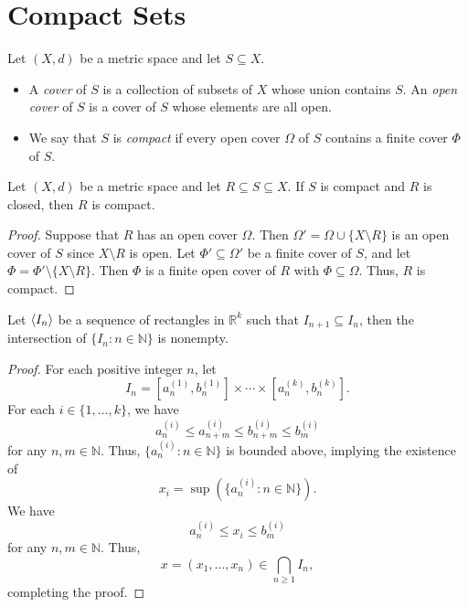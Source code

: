 \section{Compact Sets}
\begin{definition}
  Let $(X, d)$ be a metric space and let $S \subseteq X$.
  \begin{itemize}
    \item A \emph{cover} of $S$ is a collection of subsets of $X$ whose union
    contains $S$.
    An \emph{open cover} of $S$ is a cover of $S$ whose elements are all open.
    \item We say that $S$ is \emph{compact} if every open cover $\Omega$ of $S$
    contains a finite cover $\Phi$ of $S$.
  \end{itemize}
\end{definition}

\begin{theorem}
  Let $(X, d)$ be a metric space and let $R \subseteq S \subseteq X$.
  If $S$ is compact and $R$ is closed, then $R$ is compact.
\end{theorem}
\begin{proof}
  Suppose that $R$ has an open cover $\Omega$.
  Then $\Omega' = \Omega \cup \{X \setminus R\}$ is an open cover of $S$ since
  $X \setminus R$ is open.
  Let $\Phi' \subseteq \Omega'$ be a finite cover of $S$, and let
  $\Phi = \Phi' \setminus \{X \setminus R\}$.
  Then $\Phi$ is a finite open cover of $R$ with $\Phi \subseteq \Omega$.
  Thus, $R$ is compact.
\end{proof}

\begin{theorem}
  Let $\left\langle I_n\right\rangle$ be a sequence of rectangles in $\mathbb{R}^k$ such that
  $I_{n+1} \subseteq I_n$, then the intersection of $\{I_n: n \in \mathbb{N}\}$
  is nonempty.
\end{theorem}
\begin{proof}
  For each positive integer $n$, let
  \begin{equation*}
    I_n = [a_n^{(1)}, b_n^{(1)}] \times \cdots \times
    [a_n^{(k)}, b_n^{(k)}].
  \end{equation*}
  For each $i \in \{1, \dots, k\}$, we have
  \begin{equation*}
    a_n^{(i)} \leq a_{n+m}^{(i)} \leq b_{n+m}^{(i)} \leq b_m^{(i)}
  \end{equation*}
  for any $n, m \in \mathbb{N}$.
  Thus, $\{a_n^{(i)}: n \in \mathbb{N}\}$ is bounded above, implying the
  existence of
  \begin{equation*}
    x_i = \sup(\{a_n^{(i)}: n \in \mathbb{N}\}).
  \end{equation*}
  We have
  \begin{equation*}
    a_n^{(i)} \leq x_i \leq b_m^{(i)}
  \end{equation*}
  for any $n, m \in \mathbb{N}$.
  Thus,
  \begin{equation*}
    x = (x_1, \dots, x_n) \in \bigcap_{n \geq 1} I_n,
  \end{equation*}
  completing the proof.
\end{proof}

